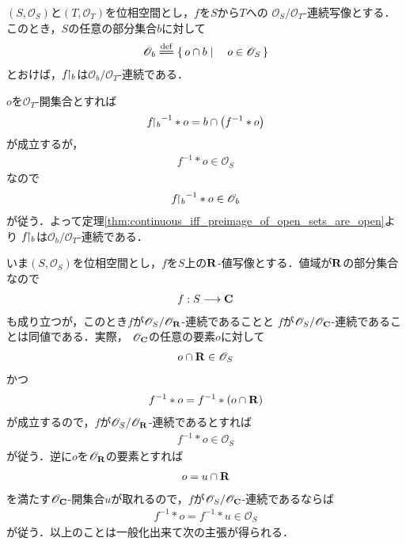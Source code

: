 	\begin{screen}
		\begin{thm}[定義域を制限しても連続]
			$(S,\mathscr{O}_{S})$と$(T,\mathscr{O}_{T})$を位相空間とし，$f$を$S$から$T$への
			$\mathscr{O}_{S}/\mathscr{O}_{T}$-連続写像とする．
			このとき，$S$の任意の部分集合$b$に対して
			\begin{align}
				\mathscr{O}_{b} \defeq \Set{o \cap b}{o \in \mathscr{O}_{S}}
			\end{align}
			とおけば，$f \hspace{-0.41em}\upharpoonright_{b}$は$\mathscr{O}_{b}/\mathscr{O}_{T}$-連続である．
		\end{thm}
	\end{screen}
	
	\begin{sketch}
		$o$を$\mathscr{O}_{T}$-開集合とすれば
		\begin{align}
			{f \hspace{-0.41em}\upharpoonright_{b}}^{-1} \ast o = b \cap \left( f^{-1} \ast o \right)
		\end{align}
		が成立するが，
		\begin{align}
			f^{-1} \ast o \in \mathscr{O}_{S}
		\end{align}
		なので
		\begin{align}
			{f \hspace{-0.41em}\upharpoonright_{b}}^{-1} \ast o \in \mathscr{O}_{b}
		\end{align}
		が従う．よって定理\ref{thm:continuous_iff_preimage_of_open_sets_are_open}より
		$f \hspace{-0.41em}\upharpoonright_{b}$は$\mathscr{O}_{b}/\mathscr{O}_{T}$-連続である．
		\QED
	\end{sketch}
	
	いま$(S,\mathscr{O}_{S})$を位相空間とし，$f$を$S$上の$\mathbf{R}$-値写像とする．値域が$\mathbf{R}$の部分集合なので
	\begin{align}
		f:S \longrightarrow \mathbf{C}
	\end{align}
	も成り立つが，このとき$f$が$\mathscr{O}_{S}/\mathscr{O}_{\mathbf{R}}$-連続であることと
	$f$が$\mathscr{O}_{S}/\mathscr{O}_{\mathbf{C}}$-連続であることは同値である．実際，
	$\mathscr{O}_{\mathbf{C}}$の任意の要素$o$に対して
	\begin{align}
		o \cap \mathbf{R} \in \mathscr{O}_{S}
	\end{align}
	かつ
	\begin{align}
		f^{-1} \ast o = f^{-1} \ast (o \cap \mathbf{R})
	\end{align}
	が成立するので，$f$が$\mathscr{O}_{S}/\mathscr{O}_{\mathbf{R}}$-連続であるとすれば
	\begin{align}
		f^{-1} \ast o \in \mathscr{O}_{S}
	\end{align}
	が従う．逆に$o$を$\mathscr{O}_{\mathbf{R}}$の要素とすれば
	\begin{align}
		o = u \cap \mathbf{R}
	\end{align}
	を満たす$\mathscr{O}_{\mathbf{C}}$-開集合$u$が取れるので，$f$が$\mathscr{O}_{S}/\mathscr{O}_{\mathbf{C}}$-連続であるならば
	\begin{align}
		f^{-1} \ast o = f^{-1} \ast u \in \mathscr{O}_{S}
	\end{align}
	が従う．以上のことは一般化出来て次の主張が得られる．
	

